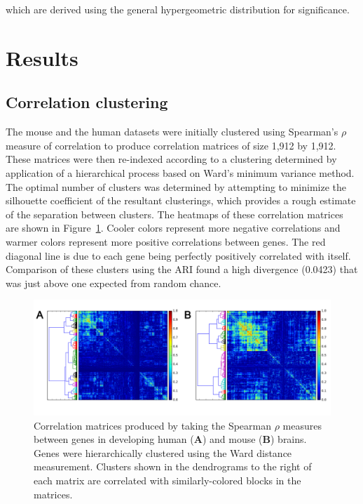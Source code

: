 \documentclass[12pt,oneside,onecolumn,a4paper]{article}
\begin{document}
\noindent
which are derived using the general hypergeometric distribution for significance.

\section{Results}

\subsection{Correlation clustering}

The mouse and the human datasets were initially clustered using Spearman's $\rho$ measure of correlation to produce correlation matrices of size 1,912 by 1,912. These matrices were then re-indexed according to a clustering determined by application of a hierarchical process based on Ward's minimum variance method. The optimal number of clusters was determined by attempting to minimize the silhouette coefficient of the resultant clusterings, which provides a rough estimate of the separation between clusters. The heatmaps of these correlation matrices are shown in Figure~\ref{fig:correlations}. Cooler colors represent more negative correlations and warmer colors represent more positive correlations between genes. The red diagonal line is due to each gene being perfectly positively correlated with itself. Comparison of these clusters using the ARI found a high divergence (0.0423) that was just above one expected from random chance.

\begin{figure}[H]
\begin{center}
\includegraphics[width=\columnwidth]{figures/pearson_spearman}
\caption{Correlation matrices produced by taking the Spearman $\rho$ measures between genes in developing human (\textbf{A}) and mouse (\textbf{B}) brains. Genes were hierarchically clustered using the Ward distance measurement. Clusters shown in the dendrograms to the right of each matrix are correlated with similarly-colored blocks in the matrices. \label{fig:correlations}%
}
\end{center}
\end{figure}
\end{document}
